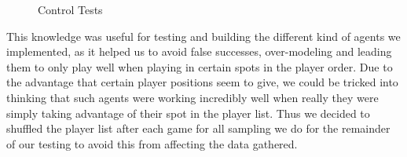 \documentclass[a4paper,11pt]{article}
\begin{document}
\begin{figure}[h]
\caption{Control Tests}
\end{figure}


	 This knowledge was useful for testing and building the different kind of agents we implemented, as it helped us to avoid false successes, over-modeling and leading them to only play well when playing in certain spots in the player order. Due to the advantage that certain player positions seem to give, we could be tricked into thinking that such agents were working incredibly well when really they were simply taking advantage of their spot in the player list. Thus we decided to shuffled the player list after each game for all sampling we do for the remainder of our testing to avoid this from affecting the data gathered.
\end{document}
